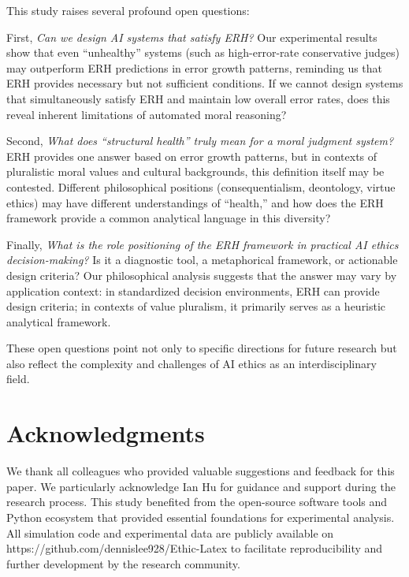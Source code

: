 \documentclass[12pt,a4paper]{article}
\theoremstyle{definition}
\theoremstyle{remark}
\begin{document}
This study raises several profound open questions:

First, \emph{Can we design AI systems that satisfy ERH?} Our experimental results show that even ``unhealthy'' systems (such as high-error-rate conservative judges) may outperform ERH predictions in error growth patterns, reminding us that ERH provides necessary but not sufficient conditions. If we cannot design systems that simultaneously satisfy ERH and maintain low overall error rates, does this reveal inherent limitations of automated moral reasoning?

Second, \emph{What does ``structural health'' truly mean for a moral judgment system?} ERH provides one answer based on error growth patterns, but in contexts of pluralistic moral values and cultural backgrounds, this definition itself may be contested. Different philosophical positions (consequentialism, deontology, virtue ethics) may have different understandings of ``health,'' and how does the ERH framework provide a common analytical language in this diversity?

Finally, \emph{What is the role positioning of the ERH framework in practical AI ethics decision-making?} Is it a diagnostic tool, a metaphorical framework, or actionable design criteria? Our philosophical analysis suggests that the answer may vary by application context: in standardized decision environments, ERH can provide design criteria; in contexts of value pluralism, it primarily serves as a heuristic analytical framework.

These open questions point not only to specific directions for future research but also reflect the complexity and challenges of AI ethics as an interdisciplinary field.

\section*{Acknowledgments}

We thank all colleagues who provided valuable suggestions and feedback for this paper. We particularly acknowledge Ian Hu for guidance and support during the research process. This study benefited from the open-source software tools and Python ecosystem that provided essential foundations for experimental analysis. All simulation code and experimental data are publicly available on https://github.com/dennislee928/Ethic-Latex to facilitate reproducibility and further development by the research community.




\end{document}

